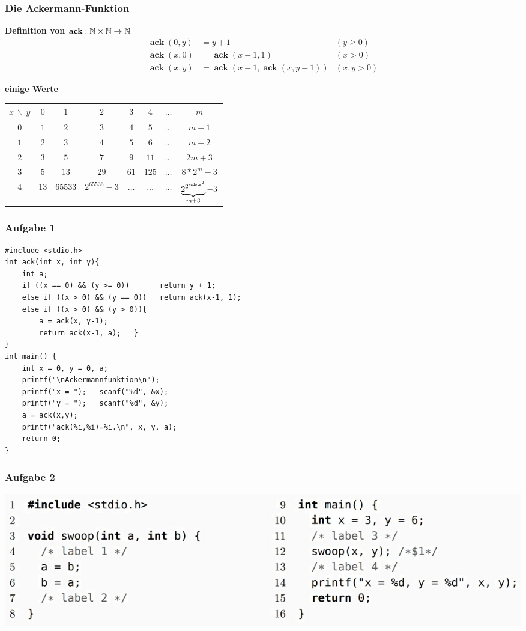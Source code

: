 \documentclass{beamer}
\DeclareMathOperator{\ack}{\mathbf{ack}}
\begin{document}
\begin{frame} \frametitle{Die Ackermann-Funktion}
\textbf{Definition von  $\ack : \N \times \N \to \N$}
	\begin{align*}
	\ack(0,y) &= y + 1 &(y \ge 0) \\
	\ack(x,0) &= \ack(x-1,1) &(x > 0)\\
	\ack(x,y) &= \ack(x-1,\ack(x,y-1)) &(x,y > 0)
	\end{align*}
	
	\textbf{einige Werte}
	
	\begin{small}
		\begin{tabular}{c||ccccccc}
			$x \ \backslash \ y$ & $0$ & $1$ & $2$ & $3$ & $4$ & $\dots$ & $m$ \\ \hline\hline
			$0$ & $1$ & $2$ & $3$ & $4$ & $5$ & $\dots$ & $m+1$ \\
			$1$ & $2$ & $3$ & $4$ & $5$ & $6$ & $\dots$ & $m+2$ \\
			$2$ & $3$ & $5$ & $7$ & $9$ & $11$ & $\dots$ & $2m+3$ \\
			$3$ & $5$ & $13$ & $29$ & $61$ & $125$ & $\dots$ & $8*2^m-3$ \\
			$4$ & $13$ & $65533$ & $2^{65536} -3$ & $\dots$ & $\dots$ & $\dots$ & $\underbrace{2^{2^{{\udots}^2}} }_{m+3}- 3$ 
		\end{tabular}
	\end{small}	
\end{frame}

\begin{frame}[fragile] \frametitle{Aufgabe 1}
	\footnotesize
\begin{lstlisting}
#include <stdio.h>
int ack(int x, int y){
	int a;
	if ((x == 0) && (y >= 0))       return y + 1;
	else if ((x > 0) && (y == 0))   return ack(x-1, 1);
	else if ((x > 0) && (y > 0)){
		a = ack(x, y-1);
		return ack(x-1, a);   }
}
int main() {
	int x = 0, y = 0, a;
	printf("\nAckermannfunktion\n");
	printf("x = ");   scanf("%d", &x);
	printf("y = ");   scanf("%d", &y);
	a = ack(x,y);
	printf("ack(%i,%i)=%i.\n", x, y, a);
	return 0;
}
\end{lstlisting}
\end{frame}

\begin{frame} \frametitle{Aufgabe 2}
	\centering
	\includegraphics[width=\textwidth]{./tut05_aufgabe2.jpg}
\end{frame}
\end{document}
